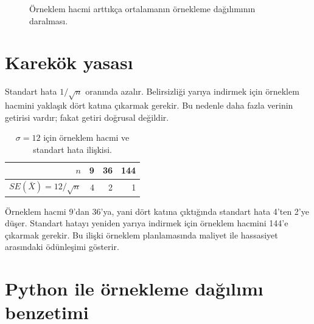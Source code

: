 \begin{figure}[htbp]
\centering
{}
\caption{Örneklem hacmi arttıkça ortalamanın örnekleme dağılımının daralması.}
\end{figure}

\section{Karekök yasası}

Standart hata $1/\sqrt n$ oranında azalır. Belirsizliği yarıya indirmek için
örneklem hacmini yaklaşık dört katına çıkarmak gerekir. Bu nedenle daha fazla
verinin getirisi vardır; fakat getiri doğrusal değildir.

\begin{table}[htbp]
\centering
\caption{$\sigma=12$ için örneklem hacmi ve standart hata ilişkisi.}
\begin{tabular}{@{}rrrr@{}}
\toprule
$n$ & 9 & 36 & 144 \\
\midrule
$SE(\bar X)=12/\sqrt n$ & 4 & 2 & 1 \\
\bottomrule
\end{tabular}
\end{table}

Örneklem hacmi 9'dan 36'ya, yani dört katına çıktığında standart hata 4'ten
2'ye düşer. Standart hatayı yeniden yarıya indirmek için örneklem hacmini
144'e çıkarmak gerekir. Bu ilişki örneklem planlamasında maliyet ile hassasiyet
arasındaki ödünleşimi gösterir.

\section{Python ile örnekleme dağılımı benzetimi}

